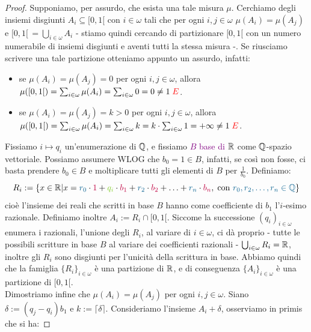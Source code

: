 \begin{proof}
	Supponiamo, per assurdo, che esista una tale misura $\mu$. Cerchiamo degli insiemi disgiunti $A_i \subseteq [0,1[$ con $i \in \omega$ tali che per ogni $i,j \in \omega$ $\mu(A_i) = \mu(A_j)$ e 
	$[0,1[\, = \bigcup_{i \in \omega} A_i$ - stiamo quindi cercando di partizionare $[0,1[$ con un numero numerabile di insiemi disgiunti e aventi tutti la stessa misura -. Se riusciamo scrivere una tale partizione otteniamo appunto un assurdo, infatti:
	\begin{itemize}
		\item se $\mu(A_i) = \mu(A_j) = 0$ per ogni $i,j \in \omega$, allora $\mu([0,1[) = \sum_{i \in \omega} \mu(A_i) = \sum_{i \in \omega}0 = 0 \ne 1 \; \textcolor{red}{\lightning}$.
		\item se $\mu(A_i) = \mu(A_j) = k > 0$ per ogni $i,j \in \omega$, allora $\mu([0,1[) = \sum_{i \in \omega} \mu(A_i) = \sum_{i \in \omega}k = k\cdot \sum_{i \in \omega} 1 = +\infty \ne 1 \; \textcolor{red}{\lightning}$.
	\end{itemize}
	Fissiamo $i \mapsto q_i$ un'enumerazione di $\mathbb Q$, e fissiamo \textcolor{purple}{$B$ base di $\mathbb R$} come $\mathbb Q$-spazio vettoriale. Possiamo assumere WLOG che $b_0 = 1 \in B$, infatti, se cos\`i non fosse,
	ci basta prendere $b_0 \in B$ e moltiplicare tutti gli elementi di $B$ per $\frac{1}{b_0}$. Definiamo:
	\[ R_i := \{x \in \RR | x = \textcolor{MidnightBlue}{r_0} \cdot \textcolor{purple}{1} + \textcolor{LimeGreen}{q_i} \cdot \textcolor{purple}{b_1} + \textcolor{MidnightBlue}{r_2} \cdot \textcolor{purple}{b_2} + \ldots + \textcolor{MidnightBlue}{r_n} \cdot \textcolor{purple}{b_n},\;\text{con \textcolor{MidnightBlue}{$r_0,r_2,\ldots,r_n \in \QQ$}}\}
		\]
	cio\`e l'insieme dei reali che scritti in base $B$ hanno come coefficiente di $b_1$ l'$i$-esimo razionale. Definiamo inoltre $A_i := R_i \cap [0,1[$.
	Siccome la successione $(q_i)_{i \in \omega}$ enumera i razionali, l'unione degli $R_i$, al variare di $i \in \omega$, ci d\`a proprio - tutte le possibili scritture in base $B$ al variare dei coefficienti razionali - $\bigcup_{i \in \omega}R_i = \mathbb R$,
	inoltre gli $R_i$ sono disgiunti per l'unicit\`a della scrittura in base. Abbiamo quindi che la famiglia $\{R_i\}_{i \in \omega}$ \`e una partizione di $\mathbb R$, e di conseguenza $\{A_i\}_{i \in \omega}$ \`e una partizione di $[0,1[$.\\
	Dimostriamo infine che $\mu(A_i) = \mu(A_j)$ per ogni $i,j \in \omega$. Siano $\delta :=(q_j - q_i)b_1$ e $k:=\lceil \delta \rceil$. Consideriamo l'insieme $A_i + \delta$, osserviamo in primis che si ha:

\end{proof}
